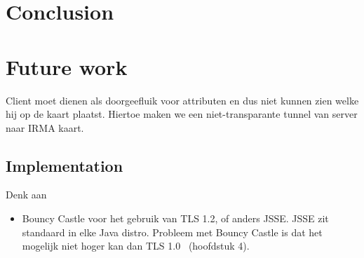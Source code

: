 \section{Conclusion}

\section{Future work}

Client moet dienen als doorgeefluik voor attributen en dus niet kunnen zien welke hij op de kaart plaatst. Hiertoe maken we een niet-transparante tunnel van server naar IRMA kaart.

\subsection{Implementation}
Denk aan
\begin{itemize}
	\item Bouncy Castle voor het gebruik van TLS 1.2, of anders JSSE. JSSE zit standaard in elke Java distro. Probleem met Bouncy Castle is dat het mogelijk niet hoger kan dan TLS 1.0~\cite{sslanalysis} (hoofdstuk 4). 
\end{itemize}

